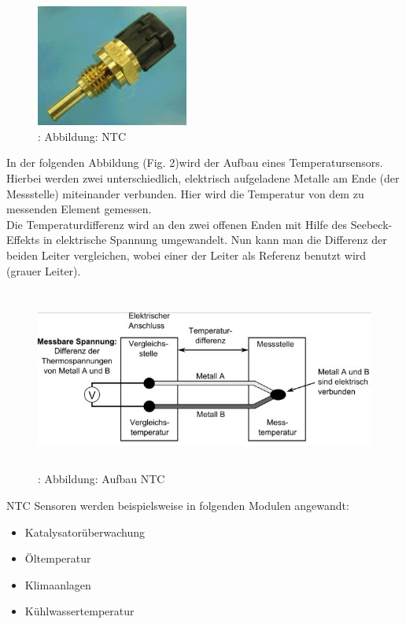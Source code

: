 			\begin{figure}
				\centering
				\includegraphics[width=5cm, height=4cm] {ntc.png}
				\caption{\cite{TS_temp_pic}: Abbildung: NTC}
			\end{figure}
			In der folgenden Abbildung (Fig. 2)wird der Aufbau eines Temperatursensors. Hierbei werden zwei unterschiedlich, elektrisch aufgeladene Metalle am Ende (der Messstelle) miteinander verbunden. Hier wird die Temperatur von dem zu messenden Element gemessen.\\
			Die Temperaturdifferenz wird an den zwei offenen Enden mit Hilfe des Seebeck-Effekts in elektrische Spannung umgewandelt. Nun kann man die Differenz der beiden Leiter vergleichen, wobei einer der Leiter als Referenz benutzt wird (grauer Leiter).\cite{TS_temp} 
				
			\begin{figure}
				\centering
				\includegraphics[width=12cm, height=6cm] {aufbau_ntc.png}
				\caption{\cite{TS_see_beck}: Abbildung: Aufbau NTC}
			\end{figure}
					
			NTC Sensoren werden beispielsweise in folgenden Modulen angewandt:
			
			\begin{itemize}
				\item Katalysatorüberwachung
				\item Öltemperatur
				\item Klimaanlagen
				\item Kühlwassertemperatur 	
			\end{itemize}
			
